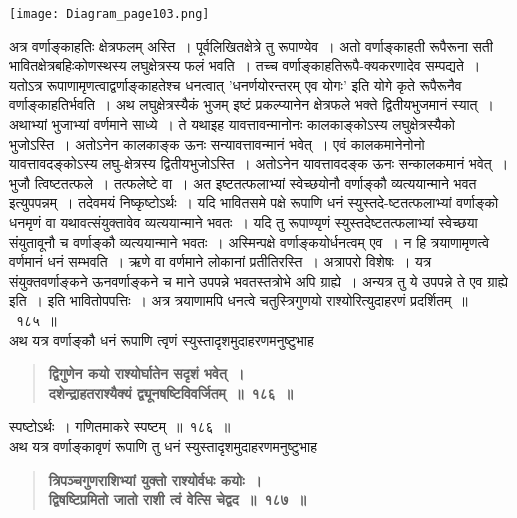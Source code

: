 \documentclass[11pt, openany]{book}
\begin{document}
\begin{sloppypar}
\begin{center}
\texttt{[image: Diagram\_page103.png]}
\end{center}

अत्र वर्णाङ्काहतिः क्षेत्रफलम् अस्ति~। पूर्वलिखितक्षेत्रे तु रूपाण्येव~। अतो वर्णाङ्काहती रूपैरूना सती भावितक्षेत्रबहिःकोणस्थस्य लघुक्षेत्रस्य फलं भवति~। तच्च वर्णाङ्काहतिरूपै-क्यकरणादेव सम्पद्यते~। यतोऽत्र रूपाणामृणत्वाद्वर्णाङ्काहतेश्च धनत्वात् 'धनर्णयोरन्तरम् एव योगः' इति योगे कृते रूपैरूनैव वर्णाङ्काहतिर्भवति~। अथ लघुक्षेत्रस्यैकं भुजम् इष्टं प्रकल्प्यानेन क्षेत्रफले भक्ते द्वितीयभुजमानं स्यात्~। अथाभ्यां भुजाभ्यां वर्णमाने साध्ये~। ते यथा\textendash \;इह यावत्तावन्मानोनः कालकाङ्कोऽस्य लघुक्षेत्रस्यैको भुजोऽस्ति~। अतोऽनेन कालकाङ्क ऊनः सन्यावत्तावन्मानं भवेत्~। एवं कालकमानेनोनो यावत्तावदङ्कोऽस्य लघु-क्षेत्रस्य द्वितीयभुजोऽस्ति~। अतोऽनेन यावत्तावदङ्क ऊनः सन्कालकमानं भवेत्~। भुजौ त्विष्टतत्फले~। तत्फलेष्टे वा~। अत इष्टतत्फलाभ्यां स्वेच्छयोनौ वर्णाङ्कौ व्यत्ययान्माने भवत इत्युपपन्नम्~। तदेवमयं निष्कृष्टोऽर्थः~। यदि भावितसमे पक्षे रूपाणि धनं स्युस्तदे-ष्टतत्फलाभ्यां वर्णाङ्को धनमृणं वा यथावत्संयुक्तावेव व्यत्ययान्माने भवतः~। यदि तु रूपाण्यृणं स्युस्तदेष्टतत्फलाभ्यां स्वेच्छया संयुतावूनौ च वर्णाङ्कौ व्यत्ययान्माने भवतः~। अस्मिन्पक्षे वर्णाङ्कयोर्धनत्वम् एव~। न हि त्रयाणामृणत्वे वर्णमानं धनं सम्भवति~। ऋणे वा वर्णमाने लोकानां प्रतीतिरस्ति~। अत्रापरो विशेषः~। यत्र संयुक्तवर्णाङ्कने ऊनवर्णाङ्कने च माने उपपन्ने भवतस्तत्रोभे अपि ग्राह्ये~। अन्यत्र तु ये उपपन्ने ते एव ग्राह्ये इति~। इति भावितोपपत्तिः~। अत्र त्रयाणामपि धनत्वे चतुस्त्रिगुणयो राश्योरित्युदाहरणं प्रदर्शितम्~॥~१८५~॥\\

{\small अथ यत्र वर्णाङ्कौ धनं रूपाणि त्वृणं स्युस्तादृशमुदाहरणमनुष्टुभाह\textendash }

 \label{11.186}
\begin{quote}
{\large \textbf{{\color{purple}द्विगुणेन कयो राश्योर्घातेन सदृशं भवेत्~।\\
दशेन्द्राहतराश्यैक्यं द्व्यूनषष्टिविवर्जितम्~॥~१८६~॥}}}
\end{quote}

स्पष्टोऽर्थः~। गणितमाकरे स्पष्टम्~॥~१८६~॥ \\

{\small अथ यत्र वर्णाङ्कावृणं रूपाणि तु धनं स्युस्तादृशमुदाहरणमनुष्टुभाह\textendash }

 \label{11.187}
\begin{quote}
{\large \textbf{{\color{purple}त्रिपञ्चगुणराशिभ्यां युक्तो राश्योर्वधः कयोः~।\\
द्विषष्टिप्रमितो जातो राशी त्वं वेत्सि चेद्वद~॥~१८७~॥}}}
\end{quote}

\end{sloppypar}
\end{document}
